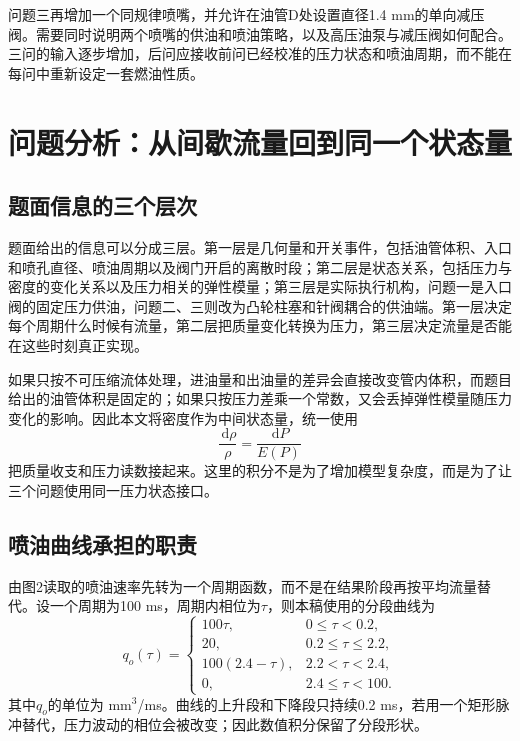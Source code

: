 \documentclass[UTF8,11pt,a4paper]{ctexart}
\newcommand{\dd}{\,\mathrm d}
\begin{document}
问题三再增加一个同规律喷嘴，并允许在油管D处设置直径1.4 mm的单向减压阀。需要同时说明两个喷嘴的供油和喷油策略，以及高压油泵与减压阀如何配合。三问的输入逐步增加，后问应接收前问已经校准的压力状态和喷油周期，而不能在每问中重新设定一套燃油性质。

\section{问题分析：从间歇流量回到同一个状态量}

\subsection{题面信息的三个层次}

题面给出的信息可以分成三层。第一层是几何量和开关事件，包括油管体积、入口和喷孔直径、喷油周期以及阀门开启的离散时段；第二层是状态关系，包括压力与密度的变化关系以及压力相关的弹性模量；第三层是实际执行机构，问题一是入口阀的固定压力供油，问题二、三则改为凸轮柱塞和针阀耦合的供油端。第一层决定每个周期什么时候有流量，第二层把质量变化转换为压力，第三层决定流量是否能在这些时刻真正实现。

如果只按不可压缩流体处理，进油量和出油量的差异会直接改变管内体积，而题目给出的油管体积是固定的；如果只按压力差乘一个常数，又会丢掉弹性模量随压力变化的影响。因此本文将密度作为中间状态量，统一使用
\begin{equation}
  \frac{\dd \rho}{\rho}=\frac{\dd P}{E(P)}
\end{equation}
把质量收支和压力读数接起来。这里的积分不是为了增加模型复杂度，而是为了让三个问题使用同一压力状态接口。

\subsection{喷油曲线承担的职责}

由图2读取的喷油速率先转为一个周期函数，而不是在结果阶段再按平均流量替代。设一个周期为100 ms，周期内相位为$\tau$，则本稿使用的分段曲线为
\begin{equation}
q_o(\tau)=
\begin{cases}
100\tau,&0\leq\tau<0.2,\\
20,&0.2\leq\tau\leq2.2,\\
100(2.4-\tau),&2.2<\tau<2.4,\\
0,&2.4\leq\tau<100.
\end{cases}
\label{eq:spray}
\end{equation}
其中$q_o$的单位为 mm$^3$/ms。曲线的上升段和下降段只持续0.2 ms，若用一个矩形脉冲替代，压力波动的相位会被改变；因此数值积分保留了分段形状。
\end{document}
